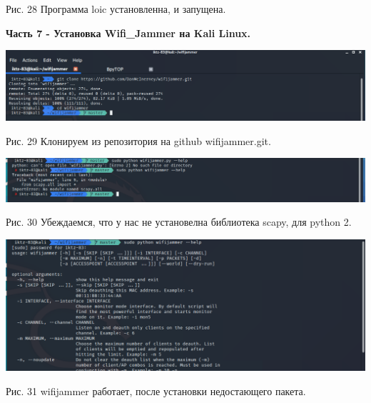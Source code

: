 \documentclass[a4paper,14pt]{extarticle}
\begin{document}
\begin{center}
        Рис. 28 Программа loic установленна, и запущена. 
        \vspace{1ex}

    \end{center}
    
    \textbf{Часть 7 - Установка Wifi\_Jammer на Kali Linux.}
    \begin{center}
        
        \includegraphics[scale=0.4]{pics/29.png}

        Рис. 29 Клонируем из репозитория на github wifijammer.git.
        \vspace{1ex}

        \includegraphics[scale=0.4]{pics/30.png}

        Рис. 30 Убеждаемся, что у нас не установелна библиотека scapy, для python 2.
        \vspace{1ex}

        \includegraphics[scale=0.4]{pics/31.png}

        Рис. 31 wifijammer работает, после установки недостающего пакета.
        \vspace{1ex}

    \end{center}
\end{document}
